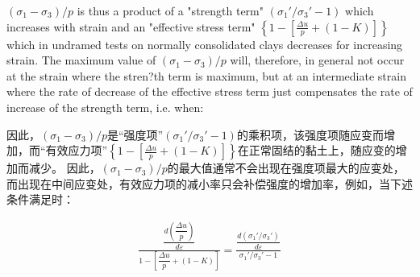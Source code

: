\begin{paracol}{2}

    $(\sigma_1-\sigma_3)/p$ is thus a product of a "strength term" $(\sigma_1'/\sigma_3'-1)$ which increases with strain and an "effective stress term" $ \left\{1-\left[\frac{\Delta{u}}{p}+(1-K)\right]\right\}$ which in undramed tests on normally consolidated clays decreases for increasing strain. The maximum value of $(\sigma_1-\sigma_3)/p$ will, therefore, in general not occur at the strain where the stren?th term is maximum, but at an intermediate strain where the rate of decrease of the effective stress term just compensates the rate of increase of the strength term, i.e. when:

    \switchcolumn

    因此，$(\sigma_1-\sigma_3)/p$是“强度项”$(\sigma_1'/\sigma_3'-1)$的乘积项，该强度项随应变而增加，而“有效应力项”$ \left\{1-\left[\frac{\Delta{u}}{p}+(1-K)\right]\right\}$在正常固结的黏土上，随应变的增加而减少。 因此，$(\sigma_1-\sigma_3)/p$的最大值通常不会出现在强度项最大的应变处，而出现在中间应变处，有效应力项的减小率只会补偿强度的增加率，例如，当下述条件满足时：

\end{paracol}

\begin{align}
    \frac{\dfrac{d\left(\dfrac{\Delta{u}}{p}\right)}{d\varepsilon}}{1-\left[\dfrac{\Delta{u}}{p}+(1-K)\right]}=\frac{\dfrac{d(\sigma_1'/\sigma_3')}{d\varepsilon}}{\sigma_1'/\sigma_3'-1}
\end{align}

